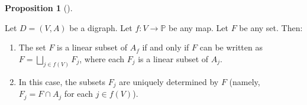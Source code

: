 \documentclass[numbers=enddot,12pt,final,onecolumn,notitlepage]{scrartcl}%
\numberwithin{exer}{section}
\theoremstyle{definition}
\newtheorem{prop}[theo]{Proposition}
\newenvironment{proposition}[1][]
{\begin{prop}[#1]\begin{leftbar}}
{\end{leftbar}\end{prop}}
\let\sqcupnonlimits\bigsqcup
\renewcommand{\bigsqcup}{\sqcupnonlimits\limits}
\begin{document}
\begin{proposition}
\label{prop.level.lin-sub-Af}Let $D=\left(  V,A\right)  $ be a digraph. Let
$f:V\rightarrow\mathbb{P}$ be any map. Let $F$ be any set. Then:

\begin{enumerate}
\item[\textbf{(a)}] The set $F$ is a linear subset of $A_{f}$ if and only if
$F$ can be written as $F=\bigsqcup_{j\in f\left(  V\right)  }F_{j}$, where
each $F_{j}$ is a linear subset of $A_{j}$.

\item[\textbf{(b)}] In this case, the subsets $F_{j}$ are uniquely determined
by $F$ (namely, $F_{j}=F\cap A_{j}$ for each $j\in f\left(  V\right)  $).
\end{enumerate}
\end{proposition}
\end{document}

